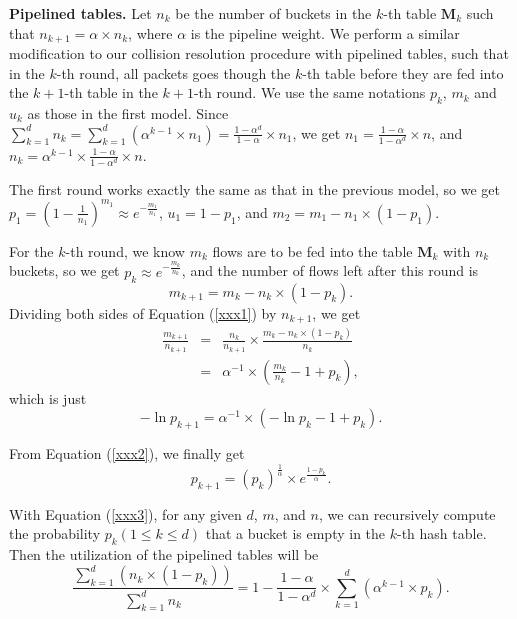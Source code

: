 \textbf{Pipelined tables.}
Let $n_k$ be the number of buckets in the $k$-th table $\mathbf{M}_k$ such that $n_{k+1}=\alpha \times n_k$, 
where $\alpha$ is the  pipeline weight.
We perform a similar modification to our collision resolution procedure with pipelined tables, 
such that in the $k$-th round, 
all packets goes though the $k$-th table before they are fed into the $k+1$-th table in the $k+1$-th round.
We use the same notations $p_k$, $m_k$ and $u_k$ as those in the first model.
Since $\sum_{k=1}^dn_k=\sum_{k=1}^d(\alpha^{k-1} \times n_1)=\frac{1-\alpha^{d}}{1-\alpha} \times n_1$, 
we get $n_1=\frac{1-\alpha}{1-\alpha^{d}} \times n$, 
and $n_k=\alpha^{k-1} \times \frac{1-\alpha}{1-\alpha^{d}} \times n$.

The first round works exactly the same as that in the previous model, 
so we get $p_{1}=(1 - \frac{1}{n_1})^{m_1} \approx e^{-\frac{m_1}{n_{1}}}$, 
$u_1=1-p_1$, and $m_2=m_1-n_{1}\times(1-p_1)$.

For the $k$-th round, we know $m_k$ flows are to be fed into the table $\mathbf{M}_{k}$ with $n_k$ buckets, 
so we get $p_{k} \approx e^{-\frac{m_k}{n_{k}}}$, 
and the number of flows left after this round is 
\begin{equation}
\label{xxx1}
m_{k+1}  =  m_{k}-n_{k}\times(1-p_k). 
\end{equation}
Dividing  both sides of Equation (\ref{xxx1}) by $n_{k+1}$, we get 
\begin{eqnarray}
\frac{m_{k+1}}{n_{k+1}} & = & \frac{n_k}{n_{k+1}}  \times \frac{m_{k}-n_{k}\times(1-p_k)}{n_k} \nonumber \\
& = & \alpha^{-1} \times \left( \frac{m_k}{n_k} - 1 + p_k  \right), \nonumber
\end{eqnarray}
which is just
\begin{equation}
\label{xxx2}
-\ln p_{k+1}=\alpha^{-1} \times (-\ln p_k -1 + p_k).
\end{equation}

From Equation (\ref{xxx2}), we finally get 
\begin{equation}
\label{xxx3}
p_{k+1}=(p_k)^{\frac{1}{\alpha}} \times e^{\frac{1-p_k}{\alpha}}. 
\end{equation}

With Equation (\ref{xxx3}), for any given $d$, $m$, and $n$, 
we can recursively compute the probability $p_k (1 \le k \le d)$ that a bucket is empty in the $k$-th hash table.
Then the utilization of the pipelined tables will be 
\begin{equation}
\label{pipelineutil}
\frac{\sum_{k=1}^{d} (n_k \times (1-p_k))}{\sum_{k=1}^{d} n_k} = 1- \frac{1-\alpha}{1-\alpha^{d}} \times \sum_{k=1}^{d}(\alpha^{k-1} \times p_{k}).
\end{equation}

